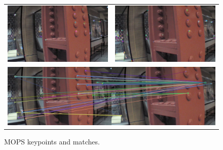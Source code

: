 \documentclass{acmsiggraph}
\begin{document}
\begin{figure}[h]
  \centering
  \begin{tabular}{cc}
    \includegraphics[resolution=150, scale=0.75]{images/mops-kp1} &
    \includegraphics[resolution=150, scale=0.75]{images/mops-kp2} \\
    \multicolumn{2}{c}{\includegraphics[resolution=150, scale=0.75]{images/mops-matches}}
  \end{tabular}
  \caption{MOPS keypoints and matches.}
  \label{fig:mops-ex}
\end{figure}
\end{document}
